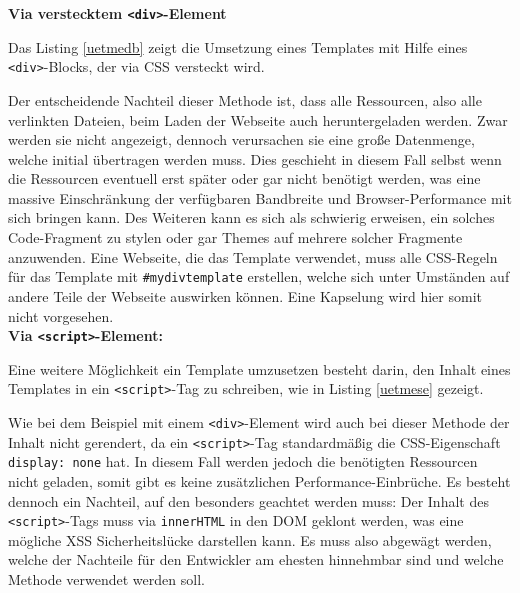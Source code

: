 \textbf{Via verstecktem \texttt{\textless{}div\textgreater{}}-Element}

Das Listing \ref{uetmedb} zeigt die Umsetzung eines Templates mit Hilfe eines \texttt{\textless{}div\textgreater{}}-Blocks, der via \ac{CSS} versteckt wird.



Der entscheidende Nachteil dieser Methode ist, dass alle Ressourcen, also alle verlinkten Dateien, beim Laden der Webseite auch heruntergeladen werden. Zwar werden sie nicht angezeigt, dennoch verursachen sie eine große Datenmenge, welche initial übertragen werden muss. Dies geschieht in diesem Fall selbst wenn die Ressourcen eventuell erst später oder gar nicht benötigt werden, was eine massive Einschränkung der verfügbaren Bandbreite und Browser-Performance mit sich bringen kann. Des Weiteren kann es sich als schwierig erweisen, ein solches Code-Fragment zu stylen oder gar Themes auf mehrere solcher Fragmente anzuwenden. Eine Webseite, die das Template verwendet, muss alle \ac{CSS}-Regeln für das Template mit \texttt{\#mydivtemplate} erstellen, welche sich unter Umständen auf andere Teile der Webseite auswirken können. Eine Kapselung wird hier somit nicht vorgesehen.\\

\textbf{Via \texttt{\textless{}script\textgreater{}}-Element:}

Eine weitere Möglichkeit ein Template umzusetzen besteht darin, den Inhalt eines Templates in ein \texttt{\textless{}script\textgreater{}}-Tag zu schreiben, wie in Listing \ref{uetmese} gezeigt.



Wie bei dem Beispiel mit einem \texttt{\textless{}div\textgreater{}}-Element wird auch bei dieser Methode der Inhalt nicht gerendert, da ein \texttt{\textless{}script\textgreater{}}-Tag standardmäßig die \ac{CSS}-Eigenschaft \texttt{display:\ none} hat. In diesem Fall werden jedoch die benötigten Ressourcen nicht geladen, somit gibt es keine zusätzlichen Performance-Einbrüche. Es besteht dennoch ein Nachteil, auf den besonders geachtet werden muss: Der Inhalt des \texttt{\textless{}script\textgreater{}}-Tags muss via \texttt{innerHTML} in den \ac{DOM} geklont werden, was eine mögliche \ac{XSS} Sicherheitslücke darstellen kann. Es muss also abgewägt werden, welche der Nachteile für den Entwickler am ehesten hinnehmbar sind und welche Methode verwendet werden soll.


